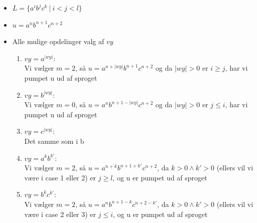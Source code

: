 \documentclass[a4, danish]{article}
\begin{document}
\begin{itemize}
  \begin{itemize}
  	\item $L = \{ a^ib^jc^k \ | \ i<j<l\}$
    \item $u = a^nb^{n+1}c^{n+2}$
    \item Alle mulige opdelinger valg af $vy$
    \begin{enumerate}
    	\item $vy=a^{|wy|}$: \\
      Vi vælger $m=2$, så $u = a^{n+|wy|}b^{n+1}c^{n+2}$ og da $|wy| > 0$ er $i\geq j$, har vi pumpet u ud af sproget
    	\item $vy=b^{|wy|}$: \\
      Vi vælger $m=0$, så  $u = a^{n}b^{n+1-|wy|}c^{n+2}$ og da $|wy| > 0$ er $j\leq i$, har vi pumpet u ud af sproget
    	\item $vy=c^{|wy|}$: \\
      Det samme som i b
    	\item $vy=a^kb^{k'}$: \\
      Vi vælger $m=2$, så $u= a^{n+k}b^{n+1+k'}c^{n+2}$, da $k>0 \land k'>0$ (ellers vil vi være i case 1 eller 2) er $j \geq l$, og u er pumpet ud af sproget
    	\item $vy=b^kc^{k'}$: \\
      Vi vælger $m=2$, så $u= a^{n}b^{n+1-k}c^{n+2-k'}$, da $k>0 \land k'>0$ (ellers vil vi være i case 2 eller 3) er $j \leq i$, og u er pumpet ud af sproget
    \end{enumerate}
  \end{itemize}
\end{itemize}
  
\end{document}
